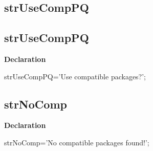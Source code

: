 \documentclass{report}
\newif\ifpdf
\begin{document}
\subsection*{\large{\textbf{strUseCompPQ}}\normalsize\hspace{1ex}\hrulefill}
\else
\subsection*{strUseCompPQ}
\fi
\label{trstrings-strUseCompPQ}
\begin{list}{}{
\setlength{\itemindent}{0cm}
\setlength{\listparindent}{0cm}
\setlength{\leftmargin}{\evensidemargin}
\addtolength{\leftmargin}{\tmplength}
\settowidth{\labelsep}{X}
\addtolength{\leftmargin}{\labelsep}
\setlength{\labelwidth}{\tmplength}
}
\item[\textbf{Declaration}\hfill]
\ifpdf
\begin{flushleft}
\fi
\begin{ttfamily}
strUseCompPQ='Use compatible packages?';\end{ttfamily}

\ifpdf
\end{flushleft}
\fi

\end{list}
\ifpdf
\subsection*{\large{\textbf{strNoComp}}\normalsize\hspace{1ex}\hrulefill}
\else
\subsection*{strNoComp}
\fi
\label{trstrings-strNoComp}
\begin{list}{}{
\setlength{\itemindent}{0cm}
\setlength{\listparindent}{0cm}
\setlength{\leftmargin}{\evensidemargin}
\addtolength{\leftmargin}{\tmplength}
\settowidth{\labelsep}{X}
\addtolength{\leftmargin}{\labelsep}
\setlength{\labelwidth}{\tmplength}
}
\item[\textbf{Declaration}\hfill]
\ifpdf
\begin{flushleft}
\fi
\begin{ttfamily}
strNoComp='No compatible packages found!';\end{ttfamily}

\ifpdf
\end{flushleft}
\fi

\end{list}
\ifpdf
\end{document}
